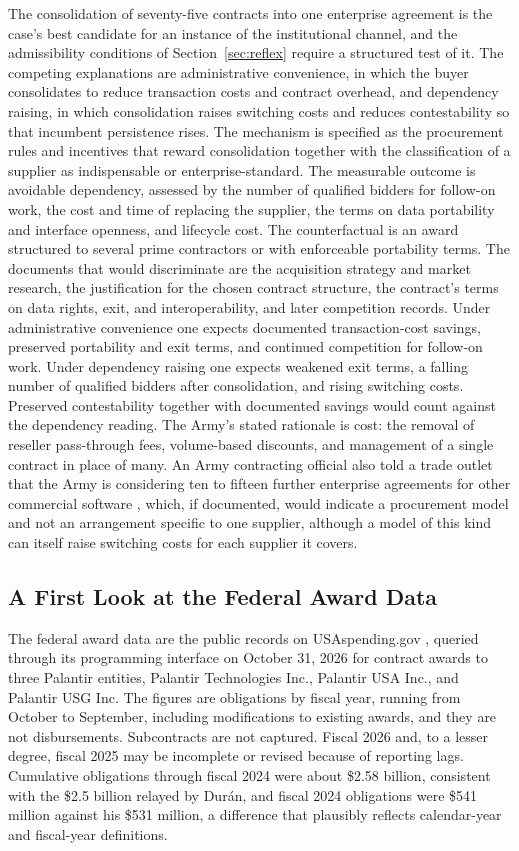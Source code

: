 \documentclass[12pt]{article}
\theoremstyle{remark}
\begin{document}
The consolidation of seventy-five contracts into one enterprise agreement is the case's best candidate for an instance of the institutional channel, and the admissibility conditions of Section~\ref{sec:reflex} require a structured test of it. The competing explanations are administrative convenience, in which the buyer consolidates to reduce transaction costs and contract overhead, and dependency raising, in which consolidation raises switching costs and reduces contestability so that incumbent persistence rises. The mechanism is specified as the procurement rules and incentives that reward consolidation together with the classification of a supplier as indispensable or enterprise-standard. The measurable outcome is avoidable dependency, assessed by the number of qualified bidders for follow-on work, the cost and time of replacing the supplier, the terms on data portability and interface openness, and lifecycle cost. The counterfactual is an award structured to several prime contractors or with enforceable portability terms. The documents that would discriminate are the acquisition strategy and market research, the justification for the chosen contract structure, the contract's terms on data rights, exit, and interoperability, and later competition records. Under administrative convenience one expects documented transaction-cost savings, preserved portability and exit terms, and continued competition for follow-on work. Under dependency raising one expects weakened exit terms, a falling number of qualified bidders after consolidation, and rising switching costs. Preserved contestability together with documented savings would count against the dependency reading. The Army's stated rationale is cost: the removal of reseller pass-through fees, volume-based discounts, and management of a single contract in place of many. An Army contracting official also told a trade outlet that the Army is considering ten to fifteen further enterprise agreements for other commercial software \cite{welch2025}, which, if documented, would indicate a procurement model and not an arrangement specific to one supplier, although a model of this kind can itself raise switching costs for each supplier it covers.

\subsection{A First Look at the Federal Award Data}

The federal award data are the public records on USAspending.gov \cite{usaspending2026}, queried through its programming interface on October 31, 2026 for contract awards to three Palantir entities, Palantir Technologies Inc., Palantir USA Inc., and Palantir USG Inc. The figures are obligations by fiscal year, running from October to September, including modifications to existing awards, and they are not disbursements. Subcontracts are not captured. Fiscal 2026 and, to a lesser degree, fiscal 2025 may be incomplete or revised because of reporting lags. Cumulative obligations through fiscal 2024 were about \$2.58 billion, consistent with the \$2.5 billion relayed by Durán, and fiscal 2024 obligations were \$541 million against his \$531 million, a difference that plausibly reflects calendar-year and fiscal-year definitions.
\end{document}
